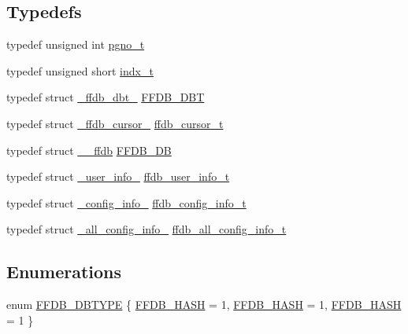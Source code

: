 \subsection*{Typedefs}
\begin{DoxyCompactItemize}
\item 
typedef unsigned int \mbox{\hyperlink{adat-devel_2other__libs_2filedb_2filehash_2ffdb__db_8h_a000813331643d38481142bcce7de1501}{pgno\+\_\+t}}
\item 
typedef unsigned short \mbox{\hyperlink{adat-devel_2other__libs_2filedb_2filehash_2ffdb__db_8h_a09ffd06672b99d3312cd7e19d4b05e45}{indx\+\_\+t}}
\item 
typedef struct \mbox{\hyperlink{struct__ffdb__dbt__}{\+\_\+ffdb\+\_\+dbt\+\_\+}} \mbox{\hyperlink{adat-devel_2other__libs_2filedb_2filehash_2ffdb__db_8h_aa2e0984399491df0fdd20898ca8758f9}{F\+F\+D\+B\+\_\+\+D\+BT}}
\item 
typedef struct \mbox{\hyperlink{struct__ffdb__cursor__}{\+\_\+ffdb\+\_\+cursor\+\_\+}} \mbox{\hyperlink{adat-devel_2other__libs_2filedb_2filehash_2ffdb__db_8h_a1383f6fb3966b0ca74206ba93b687fd9}{ffdb\+\_\+cursor\+\_\+t}}
\item 
typedef struct \mbox{\hyperlink{struct____ffdb}{\+\_\+\+\_\+ffdb}} \mbox{\hyperlink{adat-devel_2other__libs_2filedb_2filehash_2ffdb__db_8h_a0b27b956926453a7a8141ea8e10f0df8}{F\+F\+D\+B\+\_\+\+DB}}
\item 
typedef struct \mbox{\hyperlink{struct__user__info__}{\+\_\+user\+\_\+info\+\_\+}} \mbox{\hyperlink{adat-devel_2other__libs_2filedb_2filehash_2ffdb__db_8h_adcd7ce6dd6eeea724d6b6f56b37ee0f9}{ffdb\+\_\+user\+\_\+info\+\_\+t}}
\item 
typedef struct \mbox{\hyperlink{struct__config__info__}{\+\_\+config\+\_\+info\+\_\+}} \mbox{\hyperlink{adat-devel_2other__libs_2filedb_2filehash_2ffdb__db_8h_acc961fbd2faf6a849a1620309100fda1}{ffdb\+\_\+config\+\_\+info\+\_\+t}}
\item 
typedef struct \mbox{\hyperlink{struct__all__config__info__}{\+\_\+all\+\_\+config\+\_\+info\+\_\+}} \mbox{\hyperlink{adat-devel_2other__libs_2filedb_2filehash_2ffdb__db_8h_afc17234e7cd387e11de55b92df6bb0e5}{ffdb\+\_\+all\+\_\+config\+\_\+info\+\_\+t}}
\end{DoxyCompactItemize}
\subsection*{Enumerations}
\begin{DoxyCompactItemize}
\item 
enum \mbox{\hyperlink{adat-devel_2other__libs_2filedb_2filehash_2ffdb__db_8h_ad525b587adc6d7028c6f7bf7e8204185}{F\+F\+D\+B\+\_\+\+D\+B\+T\+Y\+PE}} \{ \mbox{\hyperlink{adat-devel_2other__libs_2filedb_2filehash_2ffdb__db_8h_ad525b587adc6d7028c6f7bf7e8204185aa467c3de7270ded141bd14984e8ea14f}{F\+F\+D\+B\+\_\+\+H\+A\+SH}} = 1, 
\mbox{\hyperlink{adat__devel_2other__libs_2filedb_2filehash_2ffdb__db_8h_ad525b587adc6d7028c6f7bf7e8204185aa467c3de7270ded141bd14984e8ea14f}{F\+F\+D\+B\+\_\+\+H\+A\+SH}} = 1, 
\mbox{\hyperlink{adat__devel__install_2include_2ffdb__db_8h_ad525b587adc6d7028c6f7bf7e8204185aa467c3de7270ded141bd14984e8ea14f}{F\+F\+D\+B\+\_\+\+H\+A\+SH}} = 1
 \}
\end{DoxyCompactItemize}
